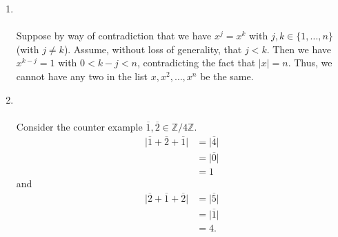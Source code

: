 \documentclass[12 pt, letterpaper]{hmcpset}
\begin{document}
\begin{solution}
\begin{enumerate}
\[\begin{split}
									& = gh
				\end{split}
			\]
			mean that $\varphi(g^{-1} h^{-1}) \neq \varphi(g^{-1}) \varphi(h^{-1})$ and thus, $\varphi$ is not a homomorphism.
		\item {} \\\\
			Suppose by way of contradiction that we have $x^{j} = x^{k}$ with $j, k \in \{ 1, \dots, n \}$ (with $j \neq k$). Assume, without loss of generality, that $j < k$. Then we have $x^{k - j} = 1$ with $0< k - j < n$, contradicting the fact that $\vert x \vert = n$. Thus, we cannot have any two in the list $x, x^{2}, \dots, x^{n}$ be the same.
		\item {} \\\\
			Consider the counter example $\overline{1}, \overline{2} \in \mathbb{Z}/4\mathbb{Z}$. 
			\[
				\begin{split}
					\vert \overline{1} + \overline{2} + \overline{1} \vert & = \vert \overline{4} \vert \\
											       & = \vert \overline{0} \vert \\
											       & = 1
				\end{split}
			\]
			and
			\[
				\begin{split}
					\vert \overline{2} + \overline{1} + \overline{2} \vert & = \vert \overline{5} \vert \\
											       & = \vert \overline{1} \vert \\
											       & = 4.
				\end{split}
			\]
	\end{enumerate}
\end{solution}
\end{document}
